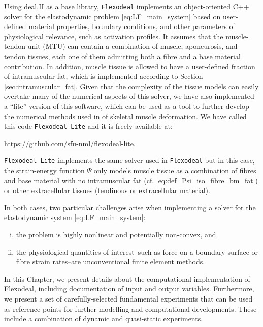 \documentclass{sfuthesis}
\numberwithin{equation}{section}
\numberwithin{figure}{chapter}
\numberwithin{table}{chapter}
\theoremstyle{definition}
\begin{document}
Using deal.II as a base library, \texttt{Flexodeal} implements an object-oriented C++ solver for the elastodynamic problem \eqref{eq:LF_main_system} based on user-defined material properties, boundary conditions, and other parameters of physiological relevance, such as activation profiles. 
It assumes that the muscle-tendon unit (MTU) can contain a combination of muscle, aponeurosis, and tendon tissues, each one of them admitting both a fibre and a base material contribution. In addition, muscle tissue is allowed to have a user-defined fraction of intramuscular fat, which is implemented according to Section \ref{sec:intramuscular_fat}. Given that the complexity of the tissue models can easily overtake many of the numerical aspects of this solver, we have also implemented a ``lite'' version of this software, which can be used as a tool to further develop the numerical methods used in of skeletal muscle deformation. We have called this code \texttt{Flexodeal Lite} and it is freely available at:
\begin{center}
    \url{https://github.com/sfu-nml/flexodeal-lite}.
\end{center}
\texttt{Flexodeal Lite} implements the same solver used in \texttt{Flexodeal} but in this case, the strain-energy function $\Psi$ only models muscle tissue as a combination of fibres and base material with no intramuscular fat (cf. \eqref{eq:def_Psi_iso_fibre_bm_fat}) or other extracellular tissues (tendinous or extracellular material).

In both cases, two particular challenges arise when implementing a solver for the elastodynamic system \eqref{eq:LF_main_system}: 
\begin{enumerate}[(i)]
    \item the problem is highly nonlinear and potentially non-convex, and
    \item the physiological quantities of interest--such as force on a boundary surface or fibre strain rates--are unconventional finite element methods.
\end{enumerate}

In this Chapter, we present details about the computational implementation of Flexodeal, including documentation of input and output variables. Furthermore, we present a set of carefully-selected fundamental experiments that can be used as reference points for further modelling and computational developments. These include a combination of dynamic and quasi-static experiments.
\end{document}
